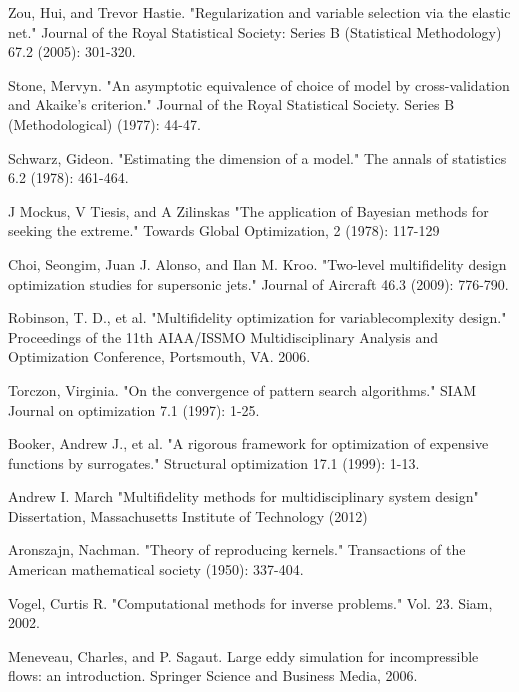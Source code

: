 \documentclass[a4paper,onecolumn]{article}
\theoremstyle{remark}
\begin{document}
\begin{thebibliography}{9}
Zou, Hui, and Trevor Hastie. 
"Regularization and variable selection via the elastic net." 
Journal of the Royal Statistical Society: Series B (Statistical Methodology) 67.2 (2005): 301-320.

Stone, Mervyn. 
"An asymptotic equivalence of choice of model by cross-validation and Akaike's criterion." 
Journal of the Royal Statistical Society. Series B (Methodological) (1977): 44-47.

Schwarz, Gideon. 
"Estimating the dimension of a model." 
The annals of statistics 6.2 (1978): 461-464.

J Mockus, V Tiesis, and A Zilinskas
"The application of Bayesian methods for seeking the extreme."
Towards Global Optimization, 2 (1978): 117-129

Choi, Seongim, Juan J. Alonso, and Ilan M. Kroo. 
"Two-level multifidelity design optimization studies for supersonic jets." 
Journal of Aircraft 46.3 (2009): 776-790.

Robinson, T. D., et al. 
"Multifidelity optimization for variablecomplexity design."
Proceedings of the 11th AIAA/ISSMO Multidisciplinary Analysis and Optimization Conference, 
Portsmouth, VA. 2006.

Torczon, Virginia. 
"On the convergence of pattern search algorithms." 
SIAM Journal on optimization 7.1 (1997): 1-25.

Booker, Andrew J., et al. 
"A rigorous framework for optimization of expensive functions by surrogates." 
Structural optimization 17.1 (1999): 1-13.

Andrew I. March
"Multifidelity methods for multidisciplinary system design"
Dissertation, Massachusetts Institute of Technology (2012)

Aronszajn, Nachman. 
"Theory of reproducing kernels." 
Transactions of the American mathematical society (1950): 337-404.

Vogel, Curtis R. 
"Computational methods for inverse problems."
Vol. 23. Siam, 2002.

Meneveau, Charles, and P. Sagaut. 
Large eddy simulation for incompressible flows: an introduction.
Springer Science and Business Media, 2006.


\end{thebibliography}
\end{document}
